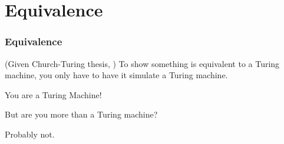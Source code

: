\documentclass[mathserif]{beamer}
\begin{document}
\section{Equivalence}
\begin{frame}
  \frametitle{Equivalence}

  \begin{center}
    (Given Church-Turing thesis, ) To show something is equivalent to a Turing
    machine, you only have to have it simulate a Turing machine.

    \vspace{10mm}

    {\Large You are a Turing Machine!

    But are you more than a Turing machine?}

    {\small Probably not.}
  \end{center}
\end{frame}
\end{document}
